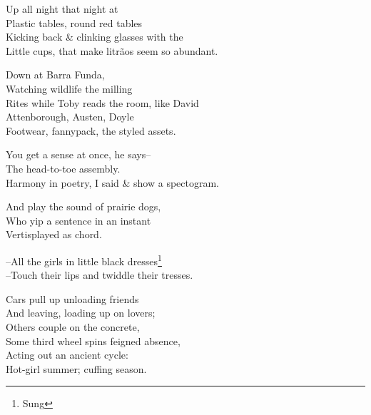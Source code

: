 

Up all night that night at \\
Plastic tables, round red tables \\
Kicking back \& clinking glasses with the \\
Little cups, that make litrãos seem so abundant.

Down at Barra Funda, \\
Watching wildlife the milling \\
Rites while Toby reads the room, like David  \\
Attenborough, Austen, Doyle \\
Footwear, fannypack, the styled assets.

You get a sense at once, he says-- \\
The head-to-toe assembly. \\
Harmony in poetry, I said \& show a spectogram.

And play the sound of prairie dogs, \\
Who yip a sentence in an instant \\
Vertisplayed as chord.

--All the girls in little black dresses\footnote{Sung} \\
--Touch their lips and twiddle their tresses. 


Cars pull up unloading friends \\
And leaving, loading up on lovers; \\
Others couple on the concrete, \\
Some third wheel spins feigned absence, \\
Acting out an ancient cycle: \\
Hot-girl summer; cuffing season.


